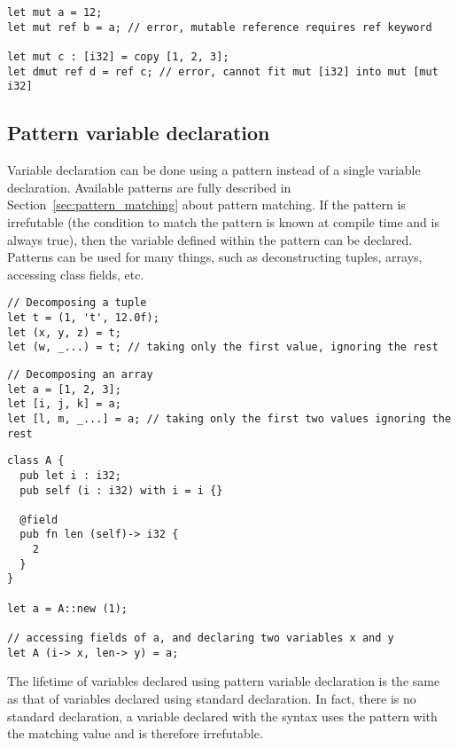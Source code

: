 \begin{lstlisting}[style=coloredverbatim]
let mut a = 12;
let mut ref b = a; // error, mutable reference requires ref keyword

let mut c : [i32] = copy [1, 2, 3];
let dmut ref d = ref c; // error, cannot fit mut [i32] into mut [mut i32]
\end{lstlisting}


\subsection{Pattern variable declaration}

Variable declaration can be done using a pattern instead of a single variable
declaration. Available patterns are fully described in
Section~\ref{sec:pattern_matching} about pattern matching. If the pattern is
irrefutable (the condition to match the pattern is known at compile time and is
always true), then the variable defined within the pattern can be declared.
Patterns can be used for many things, such as deconstructing tuples, arrays,
accessing class fields, etc.
\begin{lstlisting}[style=coloredverbatim]
// Decomposing a tuple
let t = (1, 't', 12.0f);
let (x, y, z) = t;
let (w, _...) = t; // taking only the first value, ignoring the rest
\end{lstlisting}

\begin{lstlisting}[style=coloredverbatim]
// Decomposing an array
let a = [1, 2, 3];
let [i, j, k] = a;
let [l, m, _...] = a; // taking only the first two values ignoring the rest
\end{lstlisting}

\begin{lstlisting}[style=coloredverbatim]
class A {
  pub let i : i32;
  pub self (i : i32) with i = i {}

  @field
  pub fn len (self)-> i32 {
    2
  }
}

let a = A::new (1);

// accessing fields of a, and declaring two variables x and y
let A (i-> x, len-> y) = a;
\end{lstlisting}

The lifetime of variables declared using pattern variable declaration is the
same as that of variables declared using standard declaration. In fact, there is
no standard declaration, a variable declared with the syntax  uses the pattern  with the matching value 
and is therefore irrefutable.

